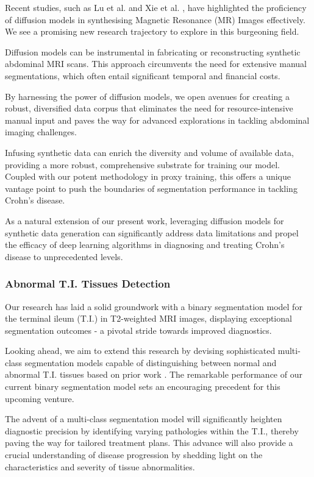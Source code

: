 Recent studies, such as Lu et al. \cite{lu2023minddiffuser} and Xie et al. \cite{xie2023synthesizing}, have highlighted the proficiency of diffusion models in synthesising Magnetic Resonance (MR) Images effectively. We see a promising new research trajectory to explore in this burgeoning field.

Diffusion models can be instrumental in fabricating or reconstructing synthetic abdominal MRI scans. This approach circumvents the need for extensive manual segmentations, which often entail significant temporal and financial costs.

By harnessing the power of diffusion models, we open avenues for creating a robust, diversified data corpus that eliminates the need for resource-intensive manual input and paves the way for advanced explorations in tackling abdominal imaging challenges.

Infusing synthetic data can enrich the diversity and volume of available data, providing a more robust, comprehensive substrate for training our model. Coupled with our potent methodology in proxy training, this offers a unique vantage point to push the boundaries of segmentation performance in tackling Crohn's disease.

As a natural extension of our present work, leveraging diffusion models for synthetic data generation can significantly address data limitations and propel the efficacy of deep learning algorithms in diagnosing and treating Crohn's disease to unprecedented levels.

\subsubsection*{Abnormal T.I. Tissues Detection}
Our research has laid a solid groundwork with a binary segmentation model for the terminal ileum (T.I.) in T2-weighted MRI images, displaying exceptional segmentation outcomes - a pivotal stride towards improved diagnostics.

Looking ahead, we aim to extend this research by devising sophisticated multi-class segmentation models capable of distinguishing between normal and abnormal T.I. tissues based on prior work \cite{Ali2022}. The remarkable performance of our current binary segmentation model sets an encouraging precedent for this upcoming venture.

The advent of a multi-class segmentation model will significantly heighten diagnostic precision by identifying varying pathologies within the T.I., thereby paving the way for tailored treatment plans. This advance will also provide a crucial understanding of disease progression by shedding light on the characteristics and severity of tissue abnormalities.

